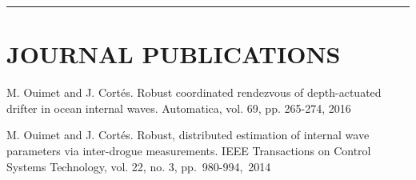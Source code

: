 \documentclass{res}
\begin{document}
\begin{resume}

\hspace{-8.5ex}\rule{16.5cm}{0.4pt}
 \vspace*{-3ex}
\section{JOURNAL PUBLICATIONS} 
\vspace{0ex}
M. Ouimet and J. Cort\'es. Robust coordinated rendezvous of depth-actuated drifter in ocean internal waves. Automatica, vol. 69, pp. 265-274, 2016\\

\vspace*{-4ex}

M. Ouimet and J. Cort\'es. Robust, distributed estimation of internal wave parameters via inter-drogue measurements. IEEE Transactions on Control Systems Technology, vol. 22, no. 3, pp.~980-994,~2014\\
\vspace*{-4ex}


\end{resume}
\end{document}
